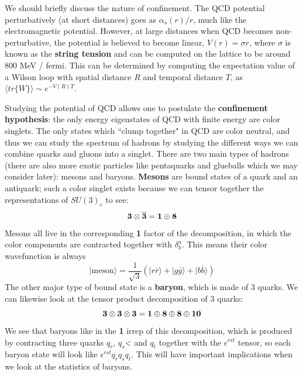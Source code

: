 \documentclass[11pt, oneside]{article}   	%
\theoremstyle{definition}
\numberwithin{equation}{subsection}		%
\begin{document}
We should briefly discuss the nature of confinement. The QCD potential perturbatively (at short distances) goes as $\alpha_s(r) / r$, 
much like the electromagnetic potential. However, at large distances when QCD becomes non-perturbative, the potential is believed to 
become linear, $V(r) = \sigma r$, where $\sigma$ is known as the \textbf{string tension} and can be computed on the lattice to be around 
800 MeV / fermi. This can be determined by computing the expectation value of a Wilson loop with spatial distance $R$ and temporal distance $T$, as $\langle tr\{W\} 
\rangle\sim e^{-V(R)T}$. 

Studying the potential of QCD allows one to postulate the \textbf{confinement hypothesis}: the only energy eigenstates of QCD with finite energy 
are color singlets. The only states which ``clump together" in QCD are color neutral, and thus we can study the spectrum of hadrons by studying 
the different ways we can combine quarks and gluons into a singlet. There are two main types of hadrons (there are also more exotic particles 
like pentaquarks and glueballs which we may consider later): mesons and baryons. \textbf{Mesons} are bound states of a quark and an antiquark; 
such a color singlet exists because we can tensor together the representations of $SU(3)_c$ to see:
\begin{equation}
	\textnormal{\textbf{3}}\otimes \overline{\textnormal{\textbf{3}}} = \textnormal{\textbf{1}}\oplus\textnormal{\textbf{8}}
\end{equation}
Mesons all live in the corresponding \textbf{1} factor of the decomposition, in which the color components are contracted together with $\delta^a_b$. 
This means their color wavefunction is always
\begin{equation}
	|\mathrm{meson}\rangle = \frac{1}{\sqrt 3} (|r\overline r\rangle + |g\overline g\rangle + |b\overline b\rangle)
\end{equation}
The other major type of bound state is a \textbf{baryon}, which is made of 3 quarks. We can likewise look at the tensor product decomposition of 
3 quarks:
\begin{equation}
	\textnormal{\textbf{3}}\otimes\textnormal{\textbf{3}}\otimes\textnormal{\textbf{3}} = \textnormal{\textbf{1}}\oplus \textnormal{\textbf{8}}\oplus 
	\textnormal{\textbf{8}}\oplus\textnormal{\textbf{10}}
\end{equation}
We see that baryons like in the \textbf{1} irrep of this decomposition, which is produced by contracting three quarks $q_r$, $q_s$< and $q_t$ 
together with the $\epsilon^{rst}$ tensor, so each baryon state will look like $\epsilon^{rst} q_r q_s q_t$. This will have important implications 
when we look at the statistics of baryons.
\end{document}
